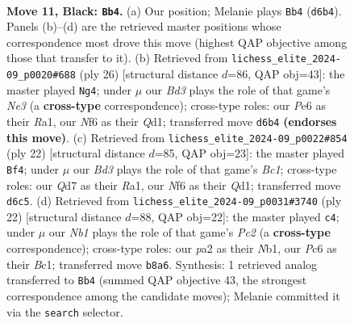 \documentclass[11pt]{article}
\begin{document}
\clearpage

\begin{figure}[p]\centering
\begin{subfigure}{0.46\textwidth}\centering
\resizebox{\linewidth}{!}{%
\newchessgame
\chessboard[
  setfen={rnb1r1k1/pp1q2pp/2pbpn2/5p2/2PP4/2N1PNP1/P4PBP/R1BQR1K1 b - - 0 11},
  showmover=false,
  pgfstyle=straightmove, color=movearrow, markmove={d6-b4}
]}
\caption{}
\end{subfigure}\hfill
\begin{subfigure}{0.46\textwidth}\centering
\resizebox{\linewidth}{!}{%
\newchessgame
\chessboard[
  setfen={r2qr1k1/pb1nnpbp/1p2p1p1/3pP3/3P4/1B2NN2/PP3PPP/R1BQR1K1 w - - 1 14},
  showmover=false,
  pgfstyle=straightmove, color=movearrow, markmove={e3-g4}
]}
\caption{}
\end{subfigure}
\\[4pt]
\begin{subfigure}{0.46\textwidth}\centering
\resizebox{\linewidth}{!}{%
\newchessgame
\chessboard[
  setfen={rnbq1rk1/1p2ppbp/5np1/3p4/3P4/pPN2NP1/P3PPBP/R1BQ1RK1 w - - 0 12},
  showmover=false,
  pgfstyle=straightmove, color=movearrow, markmove={c1-f4}
]}
\caption{}
\end{subfigure}\hfill
\begin{subfigure}{0.46\textwidth}\centering
\resizebox{\linewidth}{!}{%
\newchessgame
\chessboard[
  setfen={r1b1qrk1/p2pb1pp/1pn1p3/3nPp2/8/P2B1N2/1PP1QPPP/RNBR2K1 w - - 1 12},
  showmover=false,
  pgfstyle=straightmove, color=movearrow, markmove={c2-c4}
]}
\caption{}
\end{subfigure}
\caption{\textbf{Move 11, Black: \texttt{Bb4}.} (a) Our position; Melanie plays \texttt{Bb4} (\texttt{d6b4}). Panels (b)--(d) are the retrieved master positions whose correspondence most drove this move (highest QAP objective among those that transfer to it). (b) Retrieved from \texttt{lichess\_elite\_2024-09\_p0020\#688} (ply 26) [structural distance $d$=86, QAP obj=43]: the master played \texttt{Ng4}; under $\mu$ our \emph{Bd3} plays the role of that game's \emph{Ne3} (a \textbf{cross-type} correspondence); cross-type roles: our \emph{P}e6 as their \emph{R}a1, our \emph{N}f6 as their \emph{Q}d1; transferred move \texttt{d6b4} \textbf{(endorses this move)}. (c) Retrieved from \texttt{lichess\_elite\_2024-09\_p0022\#854} (ply 22) [structural distance $d$=85, QAP obj=23]: the master played \texttt{Bf4}; under $\mu$ our \emph{Bd3} plays the role of that game's \emph{Bc1}; cross-type roles: our \emph{Q}d7 as their \emph{R}a1, our \emph{N}f6 as their \emph{Q}d1; transferred move \texttt{d6c5}. (d) Retrieved from \texttt{lichess\_elite\_2024-09\_p0031\#3740} (ply 22) [structural distance $d$=88, QAP obj=22]: the master played \texttt{c4}; under $\mu$ our \emph{Nb1} plays the role of that game's \emph{Pc2} (a \textbf{cross-type} correspondence); cross-type roles: our \emph{p}a2 as their \emph{N}b1, our \emph{P}c6 as their \emph{B}c1; transferred move \texttt{b8a6}. Synthesis: 1 retrieved analog transferred to \texttt{Bb4} (summed QAP objective 43, the strongest correspondence among the candidate moves); Melanie committed it via the \texttt{search} selector.}
\label{fig:thought-m21}
\end{figure}
\end{document}
